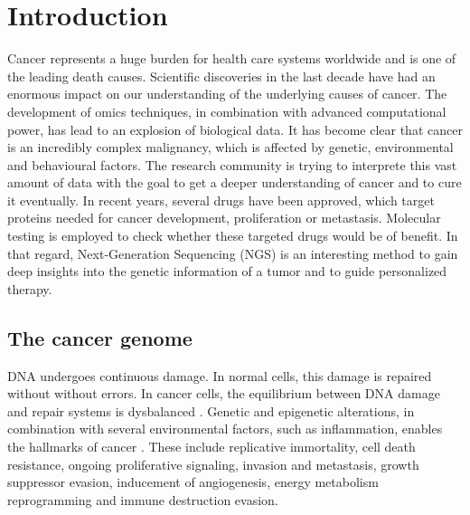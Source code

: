 \section{Introduction}

  Cancer represents a huge burden for health care systems worldwide and is one
  of the leading death causes. Scientific discoveries in the last decade have
  had an enormous impact on our understanding of the underlying causes of
  cancer. The development of omics techniques, in combination with advanced
  computational power, has lead to an explosion of biological data. It has
  become clear that cancer is an incredibly complex malignancy, which is
  affected by genetic, environmental and behavioural factors. The research
  community is trying to interprete this vast amount of data with the goal to
  get a deeper understanding of cancer and to cure it eventually. In recent
  years, several drugs have been approved, which target proteins needed for
  cancer development, proliferation or metastasis. Molecular testing is employed
  to check whether these targeted drugs would be of benefit. In that regard,
  Next-Generation Sequencing (NGS) is an interesting method to gain deep
  insights into the genetic information of a tumor and to guide personalized
  therapy.

  \subsection{The cancer genome}

    DNA undergoes continuous damage. In normal cells, this damage is repaired
    without without errors. In cancer cells, the equilibrium between DNA damage
    and repair systems is dysbalanced {\cite{dna_repair_epidemioloy}}. Genetic
    and epigenetic alterations, in combination with several environmental
    factors, such as inflammation, enables the hallmarks of cancer
    {\cite{cancer_hallmarks}}. These include replicative immortality, cell death
    resistance, ongoing proliferative signaling, invasion and metastasis, growth
    suppressor evasion, inducement of angiogenesis, energy metabolism
    reprogramming and immune destruction evasion.

